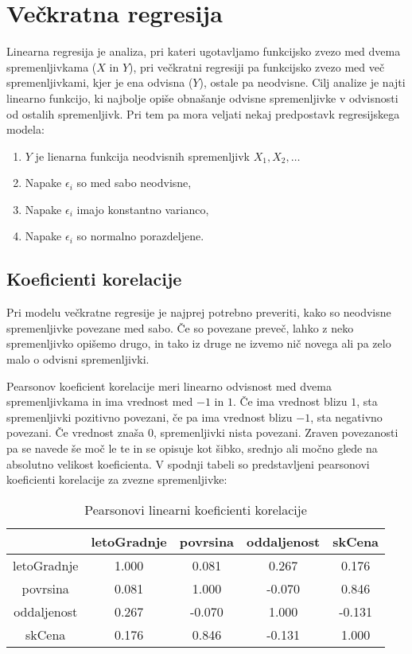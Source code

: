 \documentclass[a4paper, 12pt]{article}
\begin{document}
\section{Večkratna regresija}

Linearna regresija je analiza, pri kateri ugotavljamo funkcijsko zvezo med
dvema spremenljivkama ($ X $ in $ Y $), pri večkratni regresiji pa funkcijsko
zvezo med več spremenljivkami, kjer je ena odvisna ($ Y $), ostale pa neodvisne.
Cilj analize je najti linearno funkcijo, ki najbolje opiše obnašanje odvisne
spremenljivke v odvisnosti od ostalih spremenljivk. Pri tem pa mora veljati
nekaj predpostavk regresijskega modela:
\begin{enumerate}
	\item $ Y $ je lienarna funkcija neodvisnih spremenljivk $ X_{1}, X_{2}, \dots $
	\item Napake $ \epsilon_{i} $ so med sabo neodvisne,
	\item Napake $ \epsilon_{i} $ imajo konstantno varianco,
	\item Napake $ \epsilon_{i} $ so normalno porazdeljene.
\end{enumerate}

\subsection{Koeficienti korelacije}

Pri modelu večkratne regresije je najprej potrebno preveriti, kako so
neodvisne spremenljivke povezane med sabo. Če so povezane preveč, lahko z neko
spremenljivko opišemo drugo, in tako iz druge ne izvemo nič novega ali pa zelo
malo o odvisni spremenljivki.

Pearsonov koeficient korelacije meri linearno odvisnost med dvema
spremenljivkama in ima vrednost med $ -1 $ in $ 1 $. Če ima vrednost blizu
$ 1 $, sta spremenljivki pozitivno povezani, če pa ima vrednost blizu $ -1 $,
sta negativno povezani. Če vrednost znaša $ 0 $, spremenljivki nista
povezani. Zraven povezanosti pa se navede še moč le te in se opisuje kot šibko,
srednjo ali močno glede na absolutno velikost koeficienta.
V spodnji tabeli so predstavljeni pearsonovi koeficienti korelacije za zvezne
spremenljivke:
\begin{table}[H]
\begin{center}
\caption{Pearsonovi linearni koeficienti korelacije}
\begin{tabular}{ c|cccc }
	& letoGradnje & povrsina & oddaljenost & skCena \\
	\hline
	letoGradnje & 1.000 & 0.081 & 0.267 & 0.176 \\
	povrsina & 0.081 & 1.000 & -0.070 & 0.846 \\
	oddaljenost & 0.267 & -0.070 & 1.000 & -0.131 \\
	skCena & 0.176 & 0.846 & -0.131 & 1.000 \\
\end{tabular}
\end{center}
\end{table}
\end{document}
